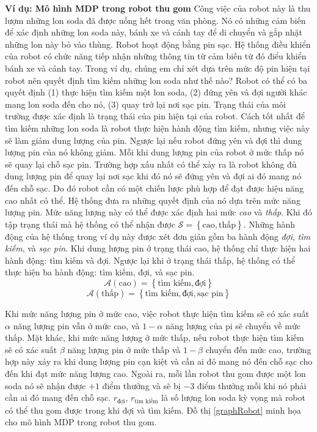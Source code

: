 	\textbf{Ví dụ: Mô hình MDP trong robot thu gom} Công việc của robot này là thu lượm những lon soda đã được uống hết trong văn phòng. Nó có những cảm biến để xác định những lon soda này, bánh xe và cánh tay để di chuyển và gắp nhặt những lon này bỏ vào thùng. Robot hoạt động bằng pin sạc. Hệ thống điều khiển của robot có chức năng tiếp nhận những thông tin từ cảm biến từ đó điểu khiển bánh xe và cánh tay. Trong ví dụ, chúng em chỉ xét dựa trên mức độ pin hiện tại robot nên quyết định tìm kiếm những lon soda như thế nào? Robot có thể có ba quyết định (1) thực hiện tìm kiếm một lon soda, (2) đứng yên và đợi người khác mang lon soda đến cho nó, (3) quay trở lại nơi sạc pin. Trạng thái của môi trường được xác định là trạng thái của pin hiện tại của robot. Cách tốt nhất để tìm kiếm những lon soda là robot thực hiện hành động tìm kiếm, nhưng việc này sẽ làm giảm dung lượng của pin. Ngược lại nếu robot đứng yên và đợi thì dung lượng pin của nó không giảm. Mỗi khi dung lượng pin của robot ở mức thấp nó sẽ quay lại chỗ sạc pin. Trường hợp xấu nhất có thể xảy ra là robot không đủ dung lượng pin để quay lại nơi sạc khi đó nó sẽ đứng yên và đợi ai đó mang nó đến chỗ sạc. Do đó robot cần có một chiến lược phù hợp để đạt được hiệu năng cao nhất có thể.
	Hệ thống đưa ra những quyết định của nó dựa trên mức năng lượng pin. Mức năng lượng này có thể được xác định hai mức \textit{cao} và \textit{thấp}. Khi đó tập trạng thái mà hệ thống có thể nhận được $\mathcal{S} = \left \{\text{cao}, \text{thấp} \right \}$. Những hành động của hệ thống trong ví dụ này được xét đơn giản gồm ba hành động \textit{đợi}, \textit{tìm kiếm}, và \textit{sạc pin}. Khi dung lượng pin ở trạng thái cao, hệ thống chỉ thực hiện hai hành động: tìm kiếm và đợi. Ngược lại khi ở trạng thái thấp, hệ thống có thể thực hiện ba hành động: tìm kiếm, đợi, và sạc pin.
		$$\mathcal{A}(\text{cao}) =  \left \{\text{tìm kiếm}, \text{đợi} \right \}$$
		$$\mathcal{A}(\text{thấp}) =  \left \{\text{tìm kiếm}, \text{đợi}, \text{sạc pin} \right \}$$
	
	Khi mức năng lượng pin ở mức cao, việc robot thực hiện tìm kiếm sẽ có xác suất $\alpha$ năng lượng pin vẫn ở mức cao, và $1 - \alpha$ năng lượng của pi sẽ chuyển về mức thấp. Mặt khác, khi mức năng lượng ở mức thấp, nếu robot thực hiện tìm kiếm sẽ có xác suất $\beta$ năng lượng pin ở mức thấp và $1 - \beta$ chuyển đến mức cao, trường hợp này xảy ra khi dung lượng pin cạn kiệt và cần ai đó mang nó đến chỗ sạc cho đến khi đạt mức năng lượng cao. Ngoài ra, mỗi lần robot thu gom được một lon soda nó sẽ nhận được $+1$ điểm thưởng và sẽ bị $-3$ điểm thưởng mỗi khi nó phải cần ai đó mang đến chỗ sạc. $r_{\text{đợi}}$, $r_{\text{tìm kiếm}}$ là số lượng lon soda kỳ vọng mà robot có thể thu gom được trong khi đợi và tìm kiếm. Đồ thị \ref{graphRobot} minh họa cho mô hình MDP trong robot thu gom.
	
